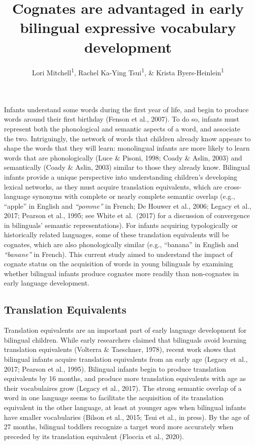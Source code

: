 \documentclass[
  english,
  ,man,floatsintext]{apa6}
\title{Cognates are advantaged in early bilingual expressive vocabulary development}
\author{Lori Mitchell\textsuperscript{1}, Rachel Ka-Ying Tsui\textsuperscript{1}, \& Krista Byers-Heinlein\textsuperscript{1}}
\date{}
\affiliation{\vspace{0.5cm}\textsuperscript{1} Concordia University}
\begin{document}
\maketitle

\captionsetup[table]{labelformat=empty}

Infants understand some words during the first year of life, and begin to produce words around their first birthday (Fenson et al., 2007). To do so, infants must represent both the phonological and semantic aspects of a word, and associate the two. Intriguingly, the network of words that children already know appears to shape the words that they will learn: monolingual infants are more likely to learn words that are phonologically (Luce \& Pisoni, 1998; Coady \& Aslin, 2003) and semantically (Coady \& Aslin, 2003) similar to those they already know. Bilingual infants provide a unique perspective into understanding children's developing lexical networks, as they must acquire translation equivalents, which are cross-language synonyms with complete or nearly complete semantic overlap (e.g., ``apple'' in English and \emph{``pomme''} in French; De Houwer et al., 2006; Legacy et al., 2017; Pearson et al., 1995; see White et al.~(2017) for a discussion of convergence in bilinguals' semantic representations). For infants acquiring typologically or historically related languages, some of these translation equivalents will be cognates, which are also phonologically similar (e.g., ``banana''  in English and \emph{``banane''}  in French). This current study aimed to understand the impact of cognate status on the acquisition of words in young bilinguals by examining whether bilingual infants produce cognates more readily than non-cognates in early language development.

\hypertarget{translation-equivalents}{%
\subsection{Translation Equivalents}\label{translation-equivalents}}

Translation equivalents are an important part of early language development for bilingual children. While early researchers claimed that bilinguals avoid learning translation equivalents (Volterra \& Taeschner, 1978), recent work shows that bilingual infants acquire translation equivalents from an early age (Legacy et al., 2017; Pearson et al., 1995). Bilingual infants begin to produce translation equivalents by 16 months, and produce more translation equivalents with age as their vocabulaires grow (Legacy et al., 2017). The strong semantic overlap of a word in one language seems to facilitate the acquisition of its translation equivalent in the other language, at least at younger ages when bilingual infants have smaller vocabularies (Bilson et al., 2015; Tsui et al., in press). By the age of 27 months, bilingual toddlers recognize a target word more accurately when preceded by its translation equivalent (Floccia et al., 2020).
\end{document}
